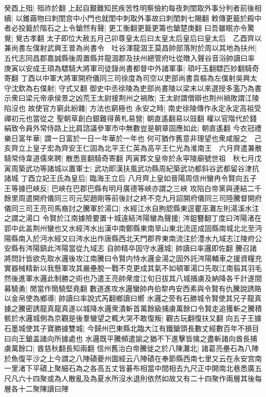 癸酉上殂|{
	殂祚於翻}
上起自艱難知民疾苦性明察儉約每夜刺閨取外事分判者前後相續|{
	以錐繭物曰刺閨宫中小門也就閨中刺取外事故曰刺閨刺七賜翻}
敕傳更籖於殿中者必投籖於階石之上令鎗然有聲|{
	更工衡翻更籖更籌也鎗楚庚翻}
曰吾雖眠亦令驚覺|{
	覺古孝翻}
太子即位大赦五月己卯尊皇太后曰太皇太后皇后曰皇太后　乙酉齊以兼尚書左僕射武興王普為尚書令　吐谷渾龍涸王莫昌帥部落附於周以其地為扶州|{
	五代志同昌郡嘉誠縣後周置縣并龍涸郡及扶州總管府吐從暾入聲谷音浴帥讀曰率}
庚寅以安成王頊為驃騎大將軍司徒錄尚書都督中外諸軍事|{
	頊吁玉翻驃匹妙翻騎奇寄翻}
丁酉以中軍大將軍開府儀同三司徐度為司空以吏部尚書袁樞為左僕射吳興太守沈欽為右僕射|{
	守式又翻}
御史中丞徐陵為吏部尚書陵以梁末以來選授多濫乃為書示衆曰梁元帝承侯景之凶荒王太尉接荆州之禍敗|{
	王太尉謂僧辯也荆州禍敗謂江陵陷沒也}
故使官方窮此紛雜|{
	方法也窮極也}
永安之時|{
	南史徐陵傳作永定永定高祖受禪初元也當從之}
聖朝草創白銀難得黄札易營|{
	朝直遙翻易以豉翻}
權以官階代於錢絹致令員外常侍路上比肩諮議參軍市中無數豈是朝章固應如此|{
	朝直遙翻}
今衣冠禮樂日富年華|{
	謂一日富於一日一年華於一年也}
何可猶作舊意非理望也衆咸服之　己亥齊立上皇子宏為齊安王仁固為北平王仁英為高平王仁光為淮南王　六月齊遣兼散騎常侍韋道儒來聘|{
	散悉亶翻騎奇寄翻}
丙寅葬文皇帝於永寜陵廟號世祖　秋七月戊寅周築武功等諸城以置軍士|{
	武功即漢扶風武功縣周紀築武功都斜谷武都留谷津抗諸城}
丁酉立妃王氏為皇后|{
	臨海王立后}
八月齊上皇如晉陽周信州蠻冉令賢向五子王等據巴峽反|{
	巴峽在巴郡巴縣有明月廣德等峽亦謂之三峽}
攻陷白帝黨與連結二千餘里周遣開府儀同三司元契趙剛等前後討之終不克九月詔開府儀同三司陸騰督開府儀同三司王亮司馬裔討之騰軍於湯口|{
	水經江水自朐䏰縣東逕瞿巫灘左則湯溪水注之謂之湯口}
令賢於江南據險要置十城遠結涔陽蠻為聲援|{
	涔鉏簪翻丁度曰涔陽渚在郢中此盖荆州蠻也又水經涔水出漢中南鄭縣東南旱山東北流逕成固縣南城北北至沔陽縣南入於沔水經又曰涔水出作唐縣西北天門郡界東南流注於澧水九域志江陵府公安縣有涔陽鎮此涔陽當從九域志}
自帥精卒固守水邏城|{
	帥讀曰率邏即佐翻}
騰召諸將問計皆欲先取水邏後攻江南騰曰令賢内恃水邏金湯之固外託涔陽輔車之援資糧充實器械精新以我懸軍攻其嚴壘脫一戰不克更成其氣不如頓軍湯口先取江南翦其羽毛然後進軍水邏此制勝之術也乃遣王亮帥衆度江旬日拔其八城捕虜及納降各千計遂間募驍勇|{
	閒當作簡驍堅堯翻}
數道進攻水邏蠻帥冉伯犂冉安西素與令賢有仇騰說誘賂以金帛使為鄉導|{
	帥讀曰率說式芮翻鄉讀曰嚮}
水邏之旁有石勝城令賢使其兄子龍真據之騰密誘龍真龍真遂以城降水邏衆潰斬首萬餘級捕虜萬餘口令賢走追獲斬之騰積骸於水邏城側為京觀是後羣蠻望之輒大哭不敢復叛|{
	觀古玩翻復扶又翻}
向五子王據石墨城使其子寶勝據雙城|{
	今歸州巴東縣北臨大江有鐵鎗頭長數丈經數百年不損目曰向王鎗盖諸向所據處也}
水邏既平騰頻遣諭之猶不下進擊皆擒之盡斬諸向酋長捕虜萬餘口|{
	酋慈秋翻長知兩翻}
信州舊治白帝騰徙之於八陳灘北|{
	諸葛亮壘石為八陣於魚復平沙之上今謂之八陣磧夔州圖經云八陣磧在奉節縣西南七里又云在永安宫南一里渚下平磧上聚細石為之各高五丈皆碁布相當中間相去九尺正中開南北巷悉廣五尺凡六十四聚或為人散亂及為夏水所沒水退則依然如故又有二十四聚作兩層其後每層各十二聚陳讀曰陣}
